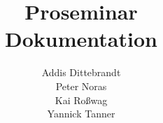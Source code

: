 \documentclass[ngerman,parskip=full]{article}
\title{
	\Huge{\textbf{Proseminar}}
	\\ [20pt] \huge{\textbf{Dokumentation}}}
\author{Addis Dittebrandt \\ Peter Noras \\ Kai Roßwag \\ Yannick Tanner}
\begin{document}
	\begin{titlepage}

		\maketitle
		\thispagestyle{empty}
		\newpage

	\end{titlepage}

	\tableofcontents 
	\newpage

	
\end{document}
